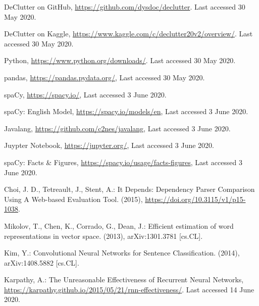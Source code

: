 \documentclass[runningheads]{llncs}
\begin{document}
%
%
\begin{thebibliography}{8}
DeClutter on GitHub, \url{https://github.com/dysdoc/declutter}. Last accessed 30 May 2020.

DeClutter on Kaggle, \url{https://www.kaggle.com/c/declutter20v2/overview/}. Last accessed 30 May 2020.

Python, \url{https://www.python.org/downloads/}. Last accessed 30 May 2020.

pandas, \url{https://pandas.pydata.org/}, Last accessed 30 May 2020.

spaCy, \url{https://spacy.io/}, Last accessed 3 June 2020.

spaCy: English Model, \url{https://spacy.io/models/en}, Last accessed 3 June 2020.

Javalang, \url{https://github.com/c2nes/javalang}, Last accessed 3 June 2020.

Juypter Notebook, \url{https://jupyter.org/}, Last accessed 3 June 2020.

spaCy: Facts \& Figures, \url{https://spacy.io/usage/facts-figures}, Last accessed 3 June 2020.

Choi, J. D., Tetreault, J., Stent, A.: It Depends: Dependency Parser Comparison Using A Web-based Evaluation Tool. (2015), \url{https://doi.org/10.3115/v1/p15-1038}.

Mikolov, T., Chen, K., Corrado, G., Dean, J.: Efficient estimation of word representations in vector space. (2013), arXiv:1301.3781 [cs.CL].

Kim, Y.: Convolutional Neural Networks for Sentence Classification. (2014), arXiv:1408.5882 [cs.CL].

Karpathy, A.: The Unreasonable Effectiveness of Recurrent Neural Networks, \url{https://karpathy.github.io/2015/05/21/rnn-effectiveness/}. Last accessed 14 June 2020.

\end{thebibliography}
\end{document}
